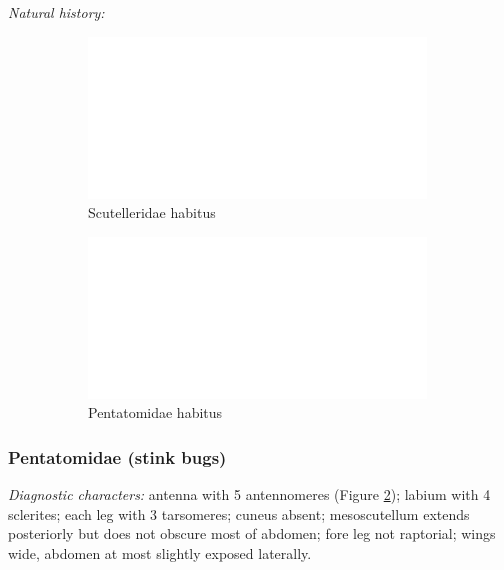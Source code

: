 \documentclass[letterpaper, 11pt]{article}
\begin{document}
\noindent{}\textit{Natural history:} \\

\begin{figure}[ht!]
 \centering
\begin{subfigure}[ht!]{0.35\textwidth}
 \includegraphics[width=\textwidth]{image14}
 \caption{Scutelleridae habitus}
 \label{fig:scutellerid1}
\end{subfigure}
 \qquad %
\begin{subfigure}[ht!]{0.35\textwidth}
 \includegraphics[width=\textwidth]{image14}
 \caption{Pentatomidae habitus}
 \label{fig:pentatomid1}
\end{subfigure}
 \caption{}\label{fig:pentscut}
\end{figure}

\subsubsection{Pentatomidae (stink bugs)}
\noindent{}\textit{Diagnostic characters:} antenna with 5 antennomeres (Figure \ref{fig:pentatomid1}); labium with 4 sclerites; each leg with 3 tarsomeres; cuneus absent; mesoscutellum extends posteriorly but does not obscure most of abdomen; fore leg not raptorial; wings wide, abdomen at most slightly exposed laterally.\\
\end{document}
